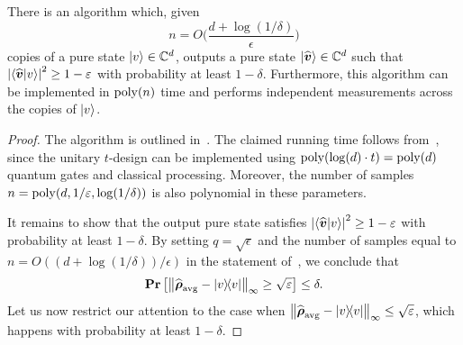 \documentclass{article}
\begin{document}
\begin{theorem}
    There is an algorithm which, given
    \begin{equation*}
        n = O\Big(\frac{d + \log(1/\delta)}{\epsilon}\Big)
    \end{equation*}
    copies of a pure state $\ket{v} \in \mathbb C^d$,
    outputs a pure state $\ket{\widehat{\boldsymbol{v}}} \in \mathbb C^d$ such that $\abs{\braket{\widehat{\boldsymbol{v}}}{v}}^2 \geq 1 - \varepsilon$ with probability at least $1 - \delta$.
    Furthermore, this algorithm can be implemented in $\operatorname{poly}(n)$ time and performs independent measurements across the copies of $\ket{v}$.
\end{theorem}

\begin{proof}
    The algorithm is outlined in~. The claimed running time follows from~, since the unitary $t$-design can be implemented using $\operatorname{poly}(\log(d)\cdot t) = \operatorname{poly}(d)$ quantum gates and classical processing. Moreover, the number of samples $n = \operatorname{poly}(d, 1/\varepsilon, \log(1/\delta))$ is also polynomial in these parameters.

    It remains to show that the output pure state satisfies $\abs{\braket{\widehat{\boldsymbol{v}}}{v}}^2 \geq 1 - \varepsilon$ with probability at least $1 - \delta$. By setting $q = \sqrt{\epsilon}$ and the number of samples equal to $n = O((d + \log(1/\delta))/\epsilon)$ in the statement of~, we conclude that
    \begin{equation*}
        \mathop{\bf Pr\/}\big[\norm{\widehat{\boldsymbol{\rho}}_{\mathrm{avg}} - \ketbra{v}}_{\infty} \geq \sqrt{\varepsilon}\big] \leq \delta.
    \end{equation*}
    Let us now restrict our attention to the case when $\norm{\widehat{\boldsymbol{\rho}}_{\mathrm{avg}} - \ketbra{v}}_{\infty} \leq \sqrt{\varepsilon}$, which happens with probability at least $1 - \delta$.


\end{proof}
\end{document}
